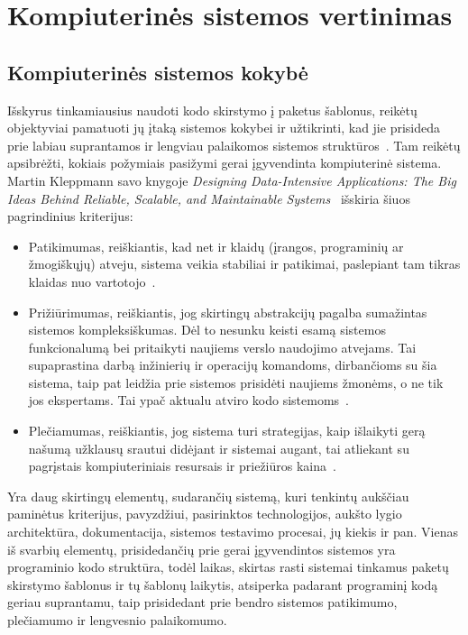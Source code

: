\section{Kompiuterinės sistemos vertinimas}
\subsection{Kompiuterinės sistemos kokybė}
Išskyrus tinkamiausius naudoti kodo skirstymo į paketus šablonus, reikėtų objektyviai pamatuoti jų įtaką sistemos kokybei ir užtikrinti,
 kad jie prisideda prie labiau suprantamos ir lengviau palaikomos sistemos struktūros~\cite{ComponentModularity}.
Tam reikėtų apsibrėžti, kokiais požymiais pasižymi gerai įgyvendinta kompiuterinė sistema.
Martin Kleppmann savo knygoje \textit{Designing Data-Intensive Applications: The Big Ideas Behind Reliable, Scalable, and Maintainable Systems}~\cite{DataIntensiveApplications} išskiria šiuos pagrindinius kriterijus:
\begin{itemize}
    \item Patikimumas, reiškiantis, kad net ir klaidų (įrangos, programinių ar žmogiškųjų) atveju,
    sistema veikia stabiliai ir patikimai, paslepiant tam tikras klaidas nuo vartotojo~\cite{DataIntensiveApplications}.
    \item Prižiūrimumas, reiškiantis, jog skirtingų abstrakcijų pagalba sumažintas sistemos kompleksiškumas.
    Dėl to nesunku keisti esamą sistemos funkcionalumą bei pritaikyti naujiems verslo naudojimo atvejams.
    Tai supaprastina darbą inžinierių ir operacijų komandoms, dirbančioms su šia sistema, taip pat leidžia prie sistemos prisidėti naujiems žmonėms, o ne
    tik jos ekspertams.
    Tai ypač aktualu atviro kodo sistemoms~\cite{DataIntensiveApplications}.
    \item Plečiamumas, reiškiantis, jog sistema turi strategijas, kaip išlaikyti gerą našumą užklausų
    srautui didėjant ir sistemai augant, tai atliekant su pagrįstais kompiuteriniais resursais ir
    priežiūros kaina~\cite{DataIntensiveApplications}.
\end{itemize}
Yra daug skirtingų elementų, sudarančių sistemą, kuri tenkintų aukščiau paminėtus kriterijus,
pavyzdžiui, pasirinktos technologijos, aukšto lygio architektūra, dokumentacija, sistemos testavimo
procesai, jų kiekis ir pan.
Vienas iš svarbių elementų, prisidedančių prie gerai įgyvendintos sistemos yra programinio kodo struktūra, todėl
laikas, skirtas rasti sistemai tinkamus paketų skirstymo šablonus ir tų šablonų laikytis, atsiperka padarant
programinį kodą geriau suprantamu, taip prisidedant prie bendro sistemos patikimumo, plečiamumo ir lengvesnio palaikomumo.

